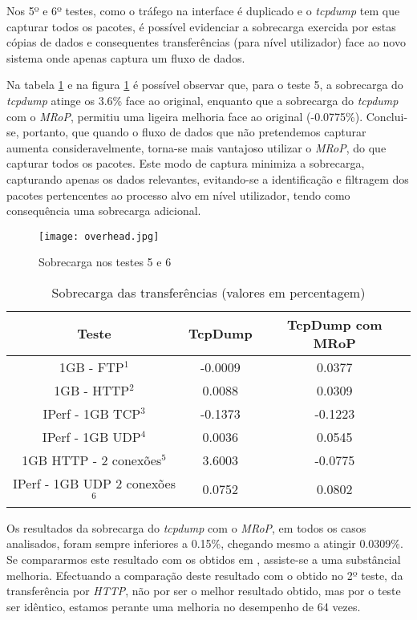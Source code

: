 Nos 5º e 6º testes, como o tráfego na interface é duplicado e o \textit{tcpdump} tem que capturar todos os pacotes, é possível evidenciar a sobrecarga exercida por estas cópias de dados e consequentes transferências (para nível utilizador) face ao novo sistema onde apenas captura um fluxo de dados.

Na tabela \ref{tab:overhead} e na figura \ref{fig:tests_overhead} é possível observar que, para o teste 5, a sobrecarga do \textit{tcpdump} atinge os 3.6\% face ao original, enquanto que a sobrecarga do \textit{tcpdump} com o \textit{MRoP}, permitiu uma ligeira melhoria face ao original (-0.0775\%).
Conclui-se, portanto, que quando o fluxo de dados que não pretendemos capturar aumenta consideravelmente, torna-se mais vantajoso utilizar o \textit{MRoP}, do que capturar todos os pacotes.
Este modo de captura minimiza a sobrecarga, capturando apenas os dados relevantes, evitando-se a identificação e filtragem dos pacotes pertencentes ao processo alvo em nível utilizador, tendo como consequência uma sobrecarga adicional.

\begin{figure}[!ht]
\centering
\texttt{[image: overhead.jpg]}
\caption{Sobrecarga nos testes 5 e 6 }
\label{fig:tests_overhead}
\end{figure}


\begin{table}[!htb]
\begin{center}
\caption{Sobrecarga das transferências (valores em percentagem)}
\begin{tabular}{ | c | c | c |}
\hline
Teste & \hspace {0.3cm} TcpDump \hspace {0.3cm} & TcpDump com MRoP  \\

\hline
1GB - FTP$^{1}$ & -0.0009  & 0.0377  \\
1GB - HTTP$^{2}$ & 0.0088 &  0.0309   \\
IPerf - 1GB TCP$^{3}$ & -0.1373 &  -0.1223   \\
IPerf - 1GB UDP$^{4}$ & 0.0036 & 0.0545 \\
\hline
\hline
1GB HTTP - 2 conexões$^{5}$ & 3.6003 & -0.0775   \\
IPerf - 1GB UDP 2 conexões$^{6}$ & 0.0752 & 0.0802   \\
\hline
\end{tabular}
\label{tab:overhead}
\end{center}
\end{table}

Os resultados da sobrecarga do \textit{tcpdump} com o \textit{MRoP}, em todos os casos analisados, foram sempre inferiores a 0.15\%, chegando mesmo a atingir 0.0309\%.
Se compararmos este resultado com os obtidos em \cite{Farruca:2009}, assiste-se a uma substâncial melhoria.
Efectuando a comparação deste resultado com o obtido no 2º teste, da transferência por \textit{HTTP}, não por ser o melhor resultado obtido, mas por o teste ser idêntico, estamos perante uma melhoria no desempenho de 64 vezes.

